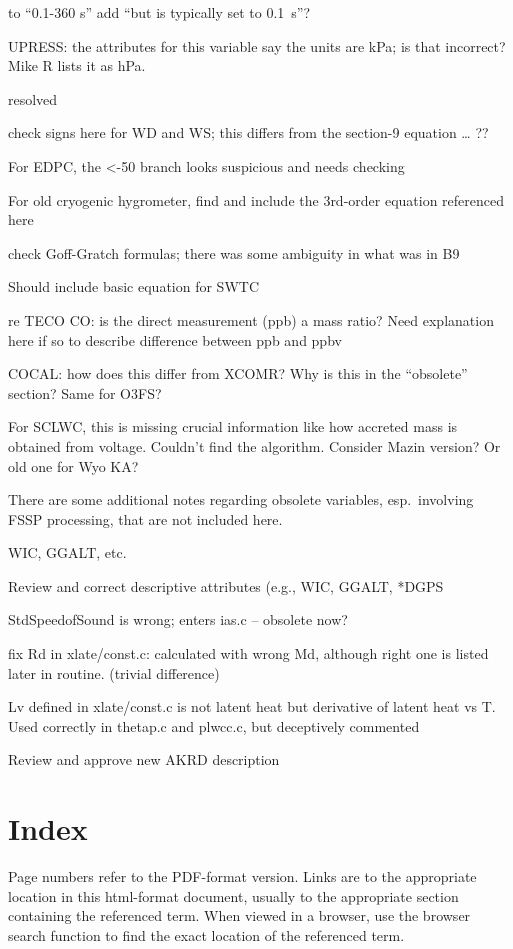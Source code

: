 \documentclass[
]{book}
\begin{document}
to ``0.1-360 s'' add ``but is typically set to 0.1~s''?

UPRESS: the attributes for this variable say the units are kPa; is that incorrect? Mike R lists it as hPa.

resolved

check signs here for WD and WS; this differs from the section-9 equation \ldots{} ??

For EDPC, the \textless-50 branch looks suspicious and needs checking

For old cryogenic hygrometer, find and include the 3rd-order equation referenced here

check Goff-Gratch formulas; there was some ambiguity in what was in B9

Should include basic equation for SWTC

re TECO CO: is the direct measurement (ppb) a mass ratio? Need explanation here if so to describe difference between ppb and ppbv

COCAL: how does this differ from XCOMR? Why is this in the ``obsolete'' section? Same for O3FS?

For SCLWC, this is missing crucial information like how accreted mass is obtained from voltage. Couldn't find the algorithm. Consider Mazin version? Or old one for Wyo KA?

There are some additional notes regarding obsolete variables, esp.~involving FSSP processing, that are not included here.

WIC, GGALT, etc.

Review and correct descriptive attributes (e.g., WIC, GGALT, *DGPS

StdSpeedofSound is wrong; enters ias.c -- obsolete now?

fix Rd in xlate/const.c: calculated with wrong Md, although right one is listed later in routine. (trivial difference)

Lv defined in xlate/const.c is not latent heat but derivative of latent heat vs T. Used correctly in thetap.c and plwcc.c, but deceptively commented

Review and approve new AKRD description

\hypertarget{index-1}{%
\chapter{Index}\label{index-1}}

Page numbers refer to the PDF-format version. Links are to the appropriate
location in this html-format document, usually to the appropriate section
containing the referenced term. When viewed in a browser, use the browser
search function to find the exact location of the referenced term.
\twocolumn
\end{document}
